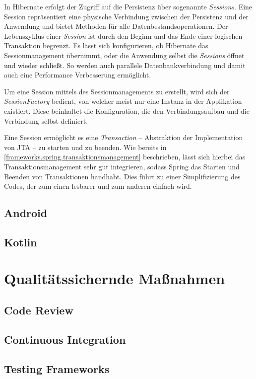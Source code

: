 				In Hibernate erfolgt der Zugriff auf die Persistenz über sogenannte \textit{Sessions}. Eine Session repräsentiert eine physische Verbindung zwischen der Persistenz und der Anwendung und bietet Methoden für alle Datenbestandsoperationen. Der Lebenszyklus einer \textit{Session} ist durch den Beginn und das Ende einer logischen Transaktion begrenzt. Es lässt sich konfigurieren, ob Hibernate das Sessionmanagement übernimmt, oder die Anwendung selbst die \textit{Sessions} öffnet und wieder schließt. So werden auch parallele Datenbankverbindung und damit auch eine Performance Verbesserung ermöglicht.
				
				Um eine Session mittels des Sessionmanagements zu erstellt, wird sich der \textit{SessionFactory} bedient, von welcher meist nur eine Instanz in der Applikation existiert. Diese beinhaltet die Konfiguration, die den Verbindungsaufbau und die Verbindung selbst definiert.
				
				Eine Session ermöglicht es eine \textit{Transaction} -- Abstraktion der Implementation von \ac{JTA} -- zu starten und zu beenden. Wie bereits in \autoref{frameworks.spring.transaktionsmanagement} beschrieben, lässt sich hierbei das Transaktionsmanagement sehr gut integrieren, sodass Spring das Starten und Beenden von Transaktionen handhabt. Dies führt zu einer Simplifizierung des Codes, der zum einen lesbarer und zum anderen einfach wird. 

		
		\subsection{Android}
		
			\subsection{Kotlin}
		
	\section{Qualitätssichernde Maßnahmen}
	
		\subsection{Code Review}
		
	
		\subsection{Continuous Integration}
		
		\subsection{Testing Frameworks}
		                                                                                                                                                                                                                                                                                                                                         
	